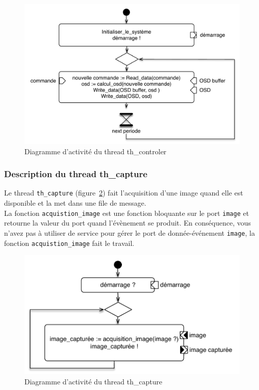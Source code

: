 \documentclass[11pt, a4paper]{paper}
\begin{document}
\begin{figure}[htbp]
\label{fig:th_controler}
\begin{center}
\parbox{9cm}{\includegraphics[scale=.5]{./figures-pdf/th_controler.pdf}}\parbox{5cm}{\caption{Diagramme d'activité du thread th\_controler}}
\end{center}
\end{figure}
\FloatBarrier


\subsubsection{Description du thread th\_capture}

Le thread {\tt th\_capture} (figure~\ref{fig:th_capture}) fait l'acquisition d'une image quand elle est disponible et la met dans une file de message.\\
La fonction {\tt acquistion\_image} est une fonction bloquante sur le port {\tt image} et retourne la valeur du port quand l'évènement se produit. En conséquence, vous n'avez pas à utiliser de service pour gérer le port de donnée-événement {\tt image}, la fonction {\tt acquistion\_image} fait le travail.

\begin{figure}[htbp]
\label{fig:th_capture}
\begin{center}
\parbox{9cm}{\includegraphics[scale=.5]{./figures-pdf/th_capture.pdf}}\parbox{5cm}{\caption{Diagramme d'activité du thread th\_capture}}
\end{center}
\end{figure}
\FloatBarrier
\end{document}
